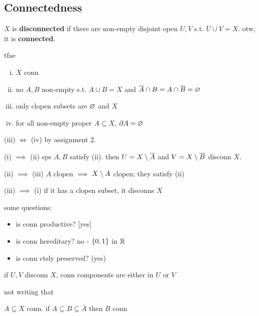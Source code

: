 \subsection{Connectedness}

\begin{defn}
    $X$ is \textbf{disconnected} if there are non-empty disjoint open $U,V$ s.t.
    $U\cup V=X$. otw, it is \textbf{connected}.
\end{defn}

\begin{prop}
    tfae \vspace{-4mm}
    \begin{enumerate}[(i)]
        \item $X$ conn
        \item no $A,B$ non-empty s.t. $A\cup B=X$ and
            $\overline{A}\cap B=A\cap\overline{B}=\varnothing$
        \item only clopen subsets are $\varnothing$ and $X$
        \item for all non-empty proper $A\subseteq X$, $\partial A=\varnothing$
    \end{enumerate}
\end{prop}

\begin{pf}[source=Primary Source Material]
    (iii) $\iff$ (iv) by assignment 2.

    (i) $\implies$ (ii) sps $A,B$ satisfy (ii).
    then $U=X\setminus\overline{A}$ and $V=X\setminus\overline{B}$ disconn $X$.

    (ii) $\implies$ (iii) $A$ clopen $\implies$ $X\setminus A$ clopen; they satisfy
    (ii)

    (iii) $\implies$ (i) if it has a clopen subset, it disconns $X$
\end{pf}
some questions:
\begin{itemize}
    \item is conn productive? [yes]
    \item is conn hereditary? no - $\left\{{0,1}\right\}$ in $\mathbb{R}$
    \item is conn ctsly preserved? (yes)
\end{itemize}

\begin{lm}
    if $U,V$ disconn $X$, conn components are either in $U$ or $V$
\end{lm}
not writing that

\begin{prop}
    $A\subseteq X$ conn. if $A\subseteq B\subseteq\bar{A}$ then $B$ conn
\end{prop} \

